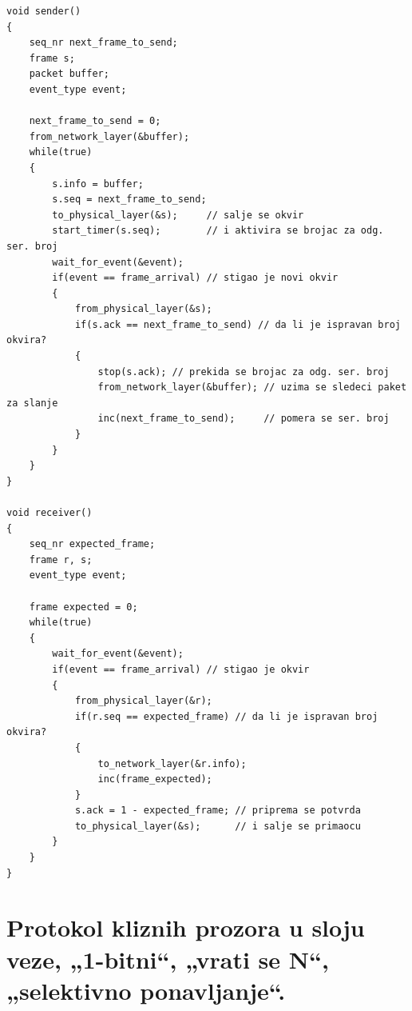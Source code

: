 \documentclass[a4paper]{article}
\begin{document}
\newpage
\begin{lstlisting}
void sender()
{
    seq_nr next_frame_to_send;
    frame s;
    packet buffer;
    event_type event;
    
    next_frame_to_send = 0;
    from_network_layer(&buffer);
    while(true)
    {
        s.info = buffer;
        s.seq = next_frame_to_send;
        to_physical_layer(&s);     // salje se okvir 
        start_timer(s.seq);        // i aktivira se brojac za odg. ser. broj
        wait_for_event(&event);   
        if(event == frame_arrival) // stigao je novi okvir
        {
            from_physical_layer(&s);
            if(s.ack == next_frame_to_send) // da li je ispravan broj okvira?
            {
                stop(s.ack); // prekida se brojac za odg. ser. broj
                from_network_layer(&buffer); // uzima se sledeci paket za slanje
                inc(next_frame_to_send);     // pomera se ser. broj
            }
        }
    }
}

void receiver()
{
    seq_nr expected_frame;
    frame r, s;
    event_type event;

    frame expected = 0;
    while(true)
    {
        wait_for_event(&event);
        if(event == frame_arrival) // stigao je okvir
        {
            from_physical_layer(&r);
            if(r.seq == expected_frame) // da li je ispravan broj okvira?
            {
                to_network_layer(&r.info);
                inc(frame_expected);
            }
            s.ack = 1 - expected_frame; // priprema se potvrda
            to_physical_layer(&s);      // i salje se primaocu
        }
    }
}
\end{lstlisting} 

\section{Protokol kliznih prozora u sloju veze, „1-bitni“, „vrati se N“, „selektivno ponavljanje“. }
\end{document}
